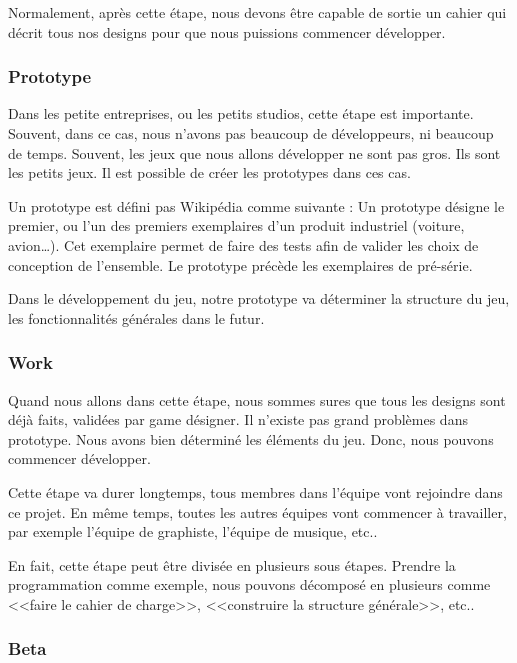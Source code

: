 Normalement, après cette étape, nous devons être capable de sortie un cahier qui décrit tous nos designs pour que nous puissions commencer développer.


\subsubsection{Prototype} %

Dans les petite entreprises, ou les petits studios, cette étape est importante. Souvent, dans ce cas, nous n'avons pas beaucoup de développeurs, ni beaucoup de temps. Souvent, les jeux que nous allons développer ne sont pas gros. Ils sont les petits jeux. Il est possible de créer les prototypes dans ces cas. 

Un prototype est défini pas Wikipédia comme suivante : Un prototype désigne le premier, ou l'un des premiers exemplaires d'un produit industriel (voiture, avion…). Cet exemplaire permet de faire des tests afin de valider les choix de conception de l'ensemble. Le prototype précède les exemplaires de pré-série. 

Dans le développement du jeu, notre prototype va déterminer la structure du jeu, les fonctionnalités générales dans le futur. 


\subsubsection{Work} %

Quand nous allons dans cette étape, nous sommes sures que tous les designs sont déjà faits, validées par game désigner. Il n'existe pas grand problèmes dans prototype. Nous avons bien déterminé les éléments du jeu. Donc, nous pouvons commencer développer. 

Cette étape va durer longtemps, tous membres dans l'équipe vont rejoindre dans ce projet. En même temps, toutes les autres équipes vont commencer à travailler, par exemple l'équipe de graphiste, l'équipe de musique, etc.. 

En fait, cette étape peut être divisée en plusieurs sous étapes. Prendre la programmation comme exemple, nous pouvons décomposé en plusieurs comme <<faire le cahier de charge>>, <<construire la structure générale>>, etc..


\subsubsection{Beta} %

